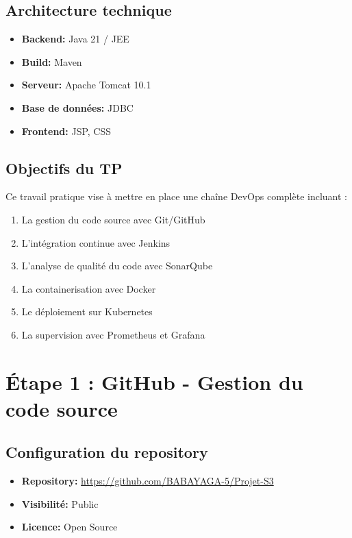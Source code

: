 \documentclass[12pt,a4paper]{article}
\begin{document}
\subsection{Architecture technique}
\begin{itemize}
    \item \textbf{Backend:} Java 21 / JEE
    \item \textbf{Build:} Maven
    \item \textbf{Serveur:} Apache Tomcat 10.1
    \item \textbf{Base de données:} JDBC
    \item \textbf{Frontend:} JSP, CSS
\end{itemize}

\subsection{Objectifs du TP}
Ce travail pratique vise à mettre en place une chaîne DevOps complète incluant :
\begin{enumerate}
    \item La gestion du code source avec Git/GitHub
    \item L'intégration continue avec Jenkins
    \item L'analyse de qualité du code avec SonarQube
    \item La containerisation avec Docker
    \item Le déploiement sur Kubernetes
    \item La supervision avec Prometheus et Grafana
\end{enumerate}

\newpage

\section{Étape 1 : GitHub - Gestion du code source}

\subsection{Configuration du repository}
\begin{itemize}
    \item \textbf{Repository:} \url{https://github.com/BABAYAGA-5/Projet-S3}
    \item \textbf{Visibilité:} Public
    \item \textbf{Licence:} Open Source
\end{itemize}
\end{document}
